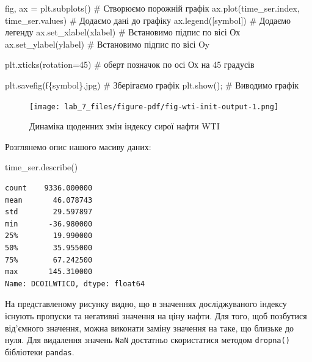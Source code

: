 \documentclass[
  letterpaper,
]{report}
\newenvironment{Shaded}{\begin{snugshade}}{\end{snugshade}}
\newcommand{\CommentTok}[1]{\textcolor[rgb]{0.37,0.37,0.37}{#1}}
\newcommand{\DecValTok}[1]{\textcolor[rgb]{0.68,0.00,0.00}{#1}}
\newcommand{\NormalTok}[1]{\textcolor[rgb]{0.00,0.23,0.31}{#1}}
\newcommand{\OperatorTok}[1]{\textcolor[rgb]{0.37,0.37,0.37}{#1}}
\newcommand{\SpecialCharTok}[1]{\textcolor[rgb]{0.37,0.37,0.37}{#1}}
\newcommand{\SpecialStringTok}[1]{\textcolor[rgb]{0.13,0.47,0.30}{#1}}
\begin{document}
\begin{Shaded}
\begin{Highlighting}[]
\NormalTok{fig, ax }\OperatorTok{=}\NormalTok{ plt.subplots()                   }\CommentTok{\# Створюємо порожній графік}
\NormalTok{ax.plot(time\_ser.index, time\_ser.values)   }\CommentTok{\# Додаємо дані до графіку}
\NormalTok{ax.legend([symbol])                        }\CommentTok{\# Додаємо легенду}
\NormalTok{ax.set\_xlabel(xlabel)                      }\CommentTok{\# Встановимо підпис по вісі Ох}
\NormalTok{ax.set\_ylabel(ylabel)                      }\CommentTok{\# Встановимо підпис по вісі Oy}

\NormalTok{plt.xticks(rotation}\OperatorTok{=}\DecValTok{45}\NormalTok{)                    }\CommentTok{\# оберт позначок по осі Ох на 45 градусів}

\NormalTok{plt.savefig(}\SpecialStringTok{f\textquotesingle{}}\SpecialCharTok{\{}\NormalTok{symbol}\SpecialCharTok{\}}\SpecialStringTok{.jpg\textquotesingle{}}\NormalTok{)               }\CommentTok{\# Зберігаємо графік }
\NormalTok{plt.show()}\OperatorTok{;}                                \CommentTok{\# Виводимо графік}
\end{Highlighting}
\end{Shaded}

\begin{figure}[H]

{\centering \texttt{[image: lab\_7\_files/figure-pdf/fig-wti-init-output-1.png]}

}

\caption{\label{fig-wti-init}Динаміка щоденних змін індексу сирої нафти
WTI}

\end{figure}

Розглянемо опис нашого масиву даних:

\begin{Shaded}
\begin{Highlighting}[]
\NormalTok{time\_ser.describe()}
\end{Highlighting}
\end{Shaded}

\begin{verbatim}
count    9336.000000
mean       46.078743
std        29.597897
min       -36.980000
25%        19.990000
50%        35.955000
75%        67.242500
max       145.310000
Name: DCOILWTICO, dtype: float64
\end{verbatim}

На представленому рисунку видно, що в значеннях досліджуваного індексу
існують пропуски та негативні значення на ціну нафти. Для того, щоб
позбутися від'ємного значення, можна виконати заміну значення на таке,
що близьке до нуля. Для видалення значень \texttt{NaN} достатньо
скористатися методом \texttt{dropna()} бібліотеки \texttt{pandas}.
\end{document}
